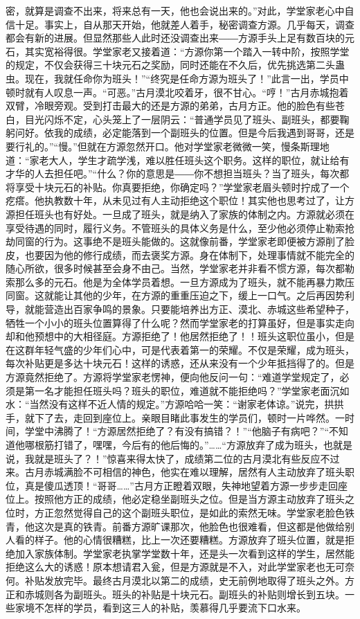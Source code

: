 \begin{this_body}
密，就算是调查不出来，将来总有一天，他也会说出来的。”对此，学堂家老心中自信十足。事实上，自从那天开始，他就差人着手，秘密调查方源。几乎每天，调查都会有新的进展。但显然那些人此时还没调查出来――方源手头上足有数百块的元石，其实宽裕得很。学堂家老又接着道：“方源你第一个踏入一转中阶，按照学堂的规定，不仅会获得三十块元石之奖励，同时还能在不久后，优先挑选第二头蛊虫。现在，我就任命你为班头！”“终究是任命方源为班头了！”此言一出，学员中顿时就有人叹息一声。“可恶。”古月漠北咬着牙，很不甘心。“哼！”古月赤城抱着双臂，冷眼旁观。受到打击最大的还是方源的弟弟，古月方正。他的脸色有些苍白，目光闪烁不定，心头笼上了一层阴云：“普通学员见了班头、副班头，都要鞠躬问好。依我的成绩，必定能落到一个副班头的位置。但是今后我遇到哥哥，还是要行礼的。”“慢。”但就在方源忽然开口。他对学堂家老微微一笑，慢条斯理地道：“家老大人，学生才疏学浅，难以胜任班头这个职务。这样的职位，就让给有才华的人去担任吧。”“什么？你的意思是――你不想担当班头？当了班头，每次都将享受十块元石的补贴。你真要拒绝，你确定吗？”学堂家老眉头顿时拧成了一个疙瘩。他执教数十年，从未见过有人主动拒绝这个职位！其实他也思考过了，让方源担任班头也有好处。一旦成了班头，就是纳入了家族的体制之内。方源就必须在享受待遇的同时，履行义务。不管班头的具体义务是什么，至少他必须停止勒索抢劫同窗的行为。这事绝不是班头能做的。这就像前番，学堂家老即便被方源削了脸皮，也要因为他的修行成绩，而去褒奖方源。身在体制下，处理事情就不能完全的随心所欲，很多时候甚至会身不由己。当然，学堂家老并非看不惯方源，每次都勒索那么多的元石。他是为全体学员着想。一旦方源成为了班头，就不能再暴力欺压同窗。这就能让其他的少年，在方源的重重压迫之下，缓上一口气。之后再因势利导，就能营造出百家争鸣的景象。只要能培养出方正、漠北、赤城这些希望种子，牺牲一个小小的班头位置算得了什么呢？然而学堂家老的打算虽好，但是事实走向却和他预想中的大相径庭。方源拒绝了！他居然拒绝了！！班头这职位虽小，但是在这群年轻气盛的少年们心中，可是代表着第一的荣耀。不仅是荣耀，成为班头，每次补贴更是多达十块元石！这样的诱惑，还从来没有一个少年抵挡得了的。但是方源竟然拒绝了。方源将学堂家老愣神，便向他反问一句：“难道学堂规定了，必须是第一名才能担任班头吗？班头的职位，难道就不能拒绝吗？”学堂家老面沉如水：“当然没有这样不近人情的规定。”方源哈哈一笑：“谢家老体谅。”说完，拱拱手，就下了去，走回到座位上。亲眼目睹此事发生的学员们，顿时一片哗然。一时间，学堂中沸腾了！“方源居然拒绝了？有没有搞错？！”“他脑子有病吧？”“不知道他哪根筋打错了，嘿嘿，今后有的他后悔的。”……“方源放弃了成为班头，也就是说，我就是班头了？！”惊喜来得太快了，成绩第二位的古月漠北有些反应不过来。古月赤城满脸不可相信的神色，他实在难以理解，居然有人主动放弃了班头职位，真是傻瓜透顶！“哥哥……”古月方正瞪着双眼，失神地望着方源一步步走回座位上。按照他方正的成绩，他必定稳坐副班头之位。但是当方源主动放弃了班头之位时，方正忽然觉得自己的这个副班头职位，是如此的索然无味。学堂家老脸色铁青，他这次是真的铁青。前番方源旷课那次，他脸色也很难看，但这都是他做给别人看的样子。他的心情很糟糕，比上一次还要糟糕。方源放弃了班头位置，就是拒绝加入家族体制。学堂家老执掌学堂数十年，还是头一次看到这样的学生，居然能拒绝这么大的诱惑！原本想请君入瓮，但是方源就是不入，对此学堂家老也无可奈何。补贴发放完毕。最终古月漠北以第二的成绩，史无前例地取得了班头之外。方正和赤城则各为副班头。班头的补贴是十块元石。副班头的补贴则增长到五块。一些家境不怎样的学员，看到这三人的补贴，羡慕得几乎要流下口水来。


\end{this_body}
